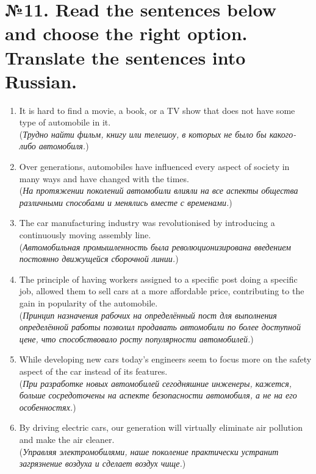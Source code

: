 \section*{№11. Read the sentences below and choose the right option. Translate the sentences into Russian.}

\begin{enumerate}
      \item It is hard to find a movie, a book, or a TV show that does not have some type of automobile in it.\\
            (\textit{Трудно найти фильм, книгу или телешоу, в которых не было бы какого-либо автомобиля.})

      \item Over generations, automobiles have influenced every aspect of society in many ways and have changed with the times.\\
            (\textit{На протяжении поколений автомобили влияли на все аспекты общества различными способами и менялись вместе с временами.})

      \item The car manufacturing industry was revolutionised by introducing a continuously moving assembly line.\\
            (\textit{Автомобильная промышленность была революционизирована введением постоянно движущейся сборочной линии.})

      \item The principle of having workers assigned to a specific post doing a specific job, allowed them to sell cars at a more affordable price, contributing to the gain in popularity of the automobile.\\
            (\textit{Принцип назначения рабочих на определённый пост для выполнения определённой работы позволил продавать автомобили по более доступной цене, что способствовало росту популярности автомобилей.})

      \item While developing new cars today’s engineers seem to focus more on the safety aspect of the car instead of its features.\\
            (\textit{При разработке новых автомобилей сегодняшние инженеры, кажется, больше сосредоточены на аспекте безопасности автомобиля, а не на его особенностях.})

      \item By driving electric cars, our generation will virtually eliminate air pollution and make the air cleaner.\\
            (\textit{Управляя электромобилями, наше поколение практически устранит загрязнение воздуха и сделает воздух чище.})


\end{enumerate}
